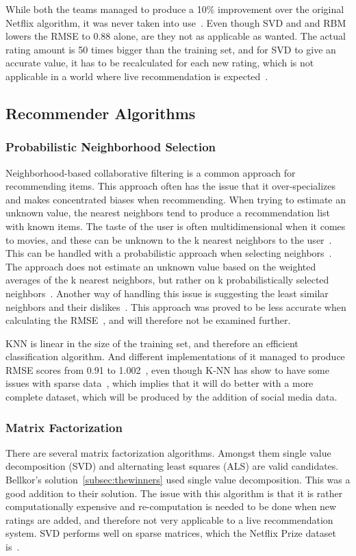 While both the teams managed to produce a 10\% improvement over the original Netflix algorithm, it was never taken into use~\cite{nfbeyond5}. Even though SVD and and RBM lowers the RMSE to 0.88 alone, are they not as applicable as wanted. The actual rating amount is 50 times bigger than the training set, and for SVD to give an accurate value, it has to be recalculated for each new rating, which is not applicable in a world where live recommendation is expected~\cite{nfbeyond5}.


\subsection{Recommender Algorithms}
\subsubsection{Probabilistic Neighborhood Selection}
Neighborhood-based collaborative filtering is a common approach for recommending items. This approach often has the issue that it over-specializes and makes concentrated biases when recommending. When trying to estimate an unknown value, the nearest neighbors tend to produce a recommendation list with known items. The taste of the user is often multidimensional when it comes to movies, and these can be unknown to the k nearest neighbors to the user~\cite{umana}. This can be handled with a probabilistic approach when selecting neighbors~\cite{probcobfilter}. The approach does not estimate an unknown value based on the weighted averages of the k nearest neighbors, but rather on k probabilistically selected neighbors~\cite{optaplanner}. Another way of handling this issue is suggesting the least similar neighbors and their dislikes~\cite{furthestneighbor}. This approach was proved to be less accurate when calculating the RMSE~\cite{probcobfilter}, and will therefore not be examined further.

KNN is linear in the size of the training set, and therefore an efficient classification algorithm\cite{introtoIR}. And different implementations of it managed to produce RMSE scores from 0.91 to 1.002~\cite{knnnetflixstand, knnoldies, knnimpl, knncolbgroup}, even though K-NN has show to have some issues with sparse data~\cite{grobelnikDataSparsityIssues}, which implies that it will do better with a more complete dataset, which will be produced by the addition of social media data.


\subsubsection{Matrix Factorization}\label{subsubsec:matrixfac}
There are several matrix factorization algorithms. Amongst them single value decomposition (SVD) and alternating least squares (ALS) are valid candidates. Bellkor's solution~\ref{subsec:thewinners} used single value decomposition. This was a good addition to their solution. The issue with this algorithm is that it is rather computationally expensive and re-computation is needed to be done when new ratings are added, and therefore not very applicable to a live recommendation system. SVD performs well on sparse matrices, which the Netflix Prize dataset is~\cite{grobelnikDataSparsityIssues}.

